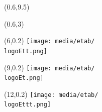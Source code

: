 \documentclass[a4paper]{article}
\newcommand{\NNT}{20XXSACLXXXX} 															%
\newcommand{\logoEt}{CEALIST} 																%
\newcommand{\vpos}{0.2}																	%
\newcommand{\hpos}{9}																		%
\newcommand{\logoEtt}{UPSUD}  																%
\newcommand{\vpostt}{0.2} 																	%
\newcommand{\hpostt}{6}																	%
\newcommand{\logoEttt}{UNICE}  																%
\newcommand{\vposttt}{0.2} 																	%
\newcommand{\hposttt}{12}																	%
\begin{document}
\begin{textblock}{1}(0.6,9.5)
	
	\Huge{}
\end{textblock}

\begin{textblock}{1}(0.6,3)
	\Large{\rotatebox{90}{\color{white}{NNT : \NNT}}}
\end{textblock}


                            

\begin{textblock}{1}(\hpostt,\vpostt)
	\texttt{[image: media/etab/\\logoEtt.png]}
\end{textblock}

\begin{textblock}{1}(\hpos,\vpos)
		\texttt{[image: media/etab/\\logoEt.png]}	
\end{textblock}

\begin{textblock}{1}(\hposttt,\vposttt)
		\texttt{[image: media/etab/\\logoEttt.png]}	
\end{textblock}
\end{document}
